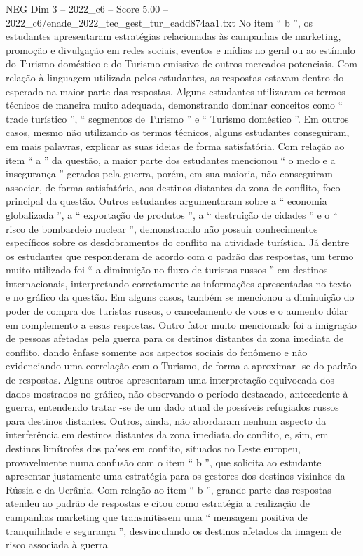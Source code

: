 \begin{textsample}{NEG Dim 3 – 2022\_c6 – Score 5.00 – 2022\_c6/enade\_2022\_tec\_gest\_tur\_eadd874aa1.txt}
No item “ b ”, os estudantes apresentaram estratégias relacionadas às campanhas de marketing, promoção e divulgação em redes sociais, eventos e mídias no geral ou ao estímulo do Turismo doméstico e do Turismo emissivo de outros mercados potenciais.
Com relação à linguagem utilizada pelos estudantes, as respostas estavam dentro do esperado na maior parte das respostas.
Alguns estudantes utilizaram os termos técnicos de maneira muito adequada, demonstrando dominar conceitos como “ trade turístico ”, “ segmentos de Turismo ” e “ Turismo doméstico ”.
Em outros casos, mesmo não utilizando os termos técnicos, alguns estudantes conseguiram, em mais palavras, explicar as suas ideias de forma satisfatória.
Com relação ao item “ a ” da questão, a maior parte dos estudantes mencionou “ o medo e a insegurança ” gerados pela guerra, porém, em sua maioria, não conseguiram associar, de forma satisfatória, aos destinos distantes da zona de conflito, foco principal da questão.
Outros estudantes argumentaram sobre a “ economia globalizada ”, a “ exportação de produtos ”, a “ destruição de cidades ” e o “ risco de bombardeio nuclear ”, demonstrando não possuir conhecimentos específicos sobre os desdobramentos do conflito na atividade turística.
Já dentre os estudantes que responderam de acordo com o padrão das respostas, um termo muito utilizado foi “ a diminuição no fluxo de turistas russos ” em destinos internacionais, interpretando corretamente as informações apresentadas no texto e no gráfico da questão.
Em alguns casos, também se mencionou a diminuição do poder de compra dos turistas russos, o cancelamento de voos e o aumento dólar em complemento a essas respostas.
Outro fator muito mencionado foi a imigração de pessoas afetadas pela guerra para os destinos distantes da zona imediata de conflito, dando ênfase somente aos aspectos sociais do fenômeno e não evidenciando uma correlação com o Turismo, de forma a aproximar -se do padrão de respostas.
Alguns outros apresentaram uma interpretação equivocada dos dados mostrados no gráfico, não observando o período destacado, antecedente à guerra, entendendo tratar -se de um dado atual de possíveis refugiados russos para destinos distantes.
Outros, ainda, não abordaram nenhum aspecto da interferência em destinos distantes da zona imediata do conflito, e, sim, em destinos limítrofes dos países em conflito, situados no Leste europeu, provavelmente numa confusão com o item “ b ”, que solicita ao estudante apresentar justamente uma estratégia para os gestores dos destinos vizinhos da Rússia e da Ucrânia.
Com relação ao item “ b ”, grande parte das respostas atendeu ao padrão de respostas e citou como estratégia a realização de campanhas marketing que transmitissem uma “ mensagem positiva de tranquilidade e segurança ”, desvinculando os destinos afetados da imagem de risco associada à guerra.

\end{textsample}
